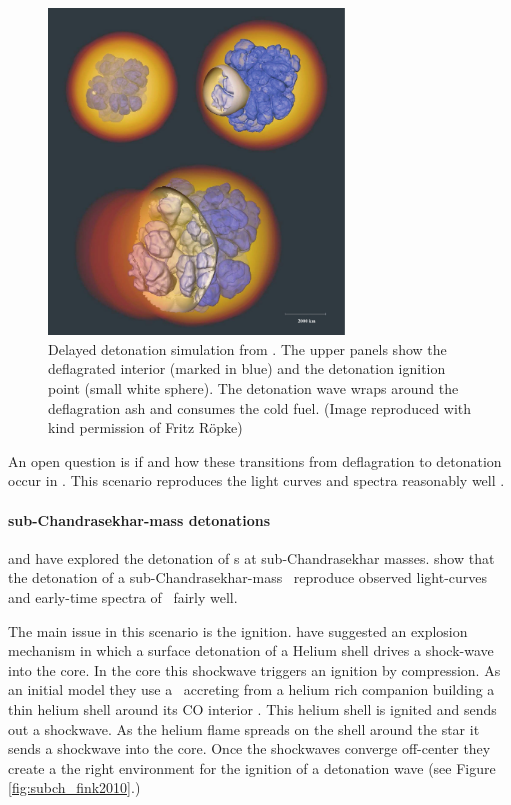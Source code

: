 \begin{figure}[htbp] %
   \centering
   \includegraphics[width=0.7\textwidth]{chapter_intro/plots/ddt_roepke08.pdf}
   \caption{ Delayed detonation simulation from \citet{2008NJPh...10l5009R}. The upper panels show the deflagrated interior (marked in blue) and the detonation ignition point (small white sphere). The detonation wave wraps around the deflagration ash and consumes the cold fuel. (Image reproduced with kind permission of Fritz R\"{o}pke)}
   \label{fig:snia_ddt_roepke2007}
\end{figure}

An open question is if and how these transitions from deflagration to detonation occur in \sneia. This scenario reproduces the light curves and spectra reasonably well \citep{2009Natur.460..869K}. 


\paragraph{sub-Chandrasekhar-mass detonations}
\label{sec:subchandra}
\citet{1992ApJ...386L..13S} and \citet{2010ApJ...714L..52S} have explored the detonation of \cowd s at sub-Chandrasekhar masses.  \citet{2010ApJ...714L..52S} show that the detonation of a sub-Chandrasekhar-mass \cowd\ reproduce observed light-curves and early-time spectra of \sneia\ fairly well.

The main issue in this scenario is the ignition. \cite{2010A&A...514A..53F} have suggested an explosion mechanism in which a surface detonation of a Helium shell drives a shock-wave into the core. In the core this shockwave triggers an ignition by compression.  As an initial model they use a \cowd\ accreting from a helium rich companion building a thin helium shell around its CO interior \citep[described in][]{2007ApJ...662L..95B}. This helium shell is ignited and sends out a shockwave. As the helium flame spreads on the shell around the star it sends a shockwave into the core. Once 
the shockwaves converge off-center they create a the right environment for the ignition of a detonation wave (see Figure \ref{fig:subch_fink2010}.) 

